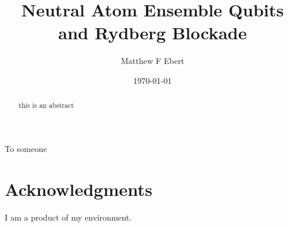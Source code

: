 
\title{Neutral Atom Ensemble Qubits and Rydberg Blockade}
\author{Matthew F Ebert}
\newcommand{\oraldate}{1/31/2017}%
\newcommand{\profA}{Iam A. Professor, Professor, Geography}
\newcommand{\profB}{Iam A. Professor, Professor, Geography}
\newcommand{\profC}{Iam A. Professor, Professor, Geography}
\newcommand{\profD}{Iam A. Professor, Professor, Geography}
\newcommand{\profE}{Iam A. Professor, Professor, Geography}
\date{\today{}}

\maketitle

\begin{dedication}
  To someone
\end{dedication}

\begin{abstract}
  this is an abstract
\end{abstract}

\chapter*{Acknowledgments}%
I am a product of my environment.

\clearpage

\tableofcontents

